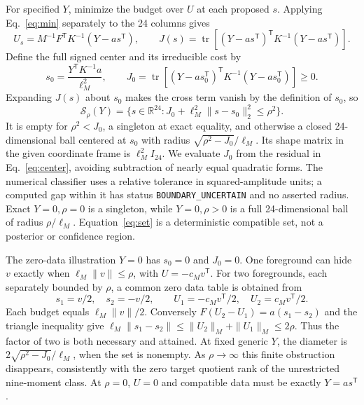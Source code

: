 \documentclass[aps,prd,onecolumn,11pt,nofootinbib,notitlepage]{revtex4-2}
\begin{document}
For specified $Y$, minimize the budget over $U$ at each proposed $s$. Applying Eq.~\eqref{eq:min} separately to the 24 columns gives
\begin{equation}
 U_s=M^{-1}F^{\mathsf T}K^{-1}(Y-a s^{\mathsf T}),\qquad
 J(s)=\operatorname{tr}\left[(Y-a s^{\mathsf T})^{\mathsf T}K^{-1}(Y-a s^{\mathsf T})\right].
 \label{eq:conditional}
\end{equation}
Define the full signed center and its irreducible cost by
\begin{equation}
 s_0=\frac{Y^{\mathsf T}K^{-1}a}{\ell_M^2},\qquad
 J_0=\operatorname{tr}\left[(Y-a s_0^{\mathsf T})^{\mathsf T}K^{-1}(Y-a s_0^{\mathsf T})\right]\ge0.
 \label{eq:center}
\end{equation}
Expanding $J(s)$ about $s_0$ makes the cross term vanish by the definition of $s_0$, so
\begin{equation}
 \boxed{\mathcal S_\rho(Y)=\{s\in\mathbb R^{24}:J_0+\ell_M^2\|s-s_0\|_2^2\le\rho^2\}.}
 \label{eq:set}
\end{equation}
It is empty for $\rho^2<J_0$, a singleton at exact equality, and otherwise a closed 24-dimensional ball centered at $s_0$ with radius $\sqrt{\rho^2-J_0}/\ell_M$. Its shape matrix in the given coordinate frame is $\ell_M^2 I_{24}$. We evaluate $J_0$ from the residual in Eq.~\eqref{eq:center}, avoiding subtraction of nearly equal quadratic forms. The numerical classifier uses a relative tolerance in squared-amplitude units; a computed gap within it has status \texttt{BOUNDARY\_UNCERTAIN} and no asserted radius. Exact $Y=0,\rho=0$ is a singleton, while $Y=0,\rho>0$ is a full 24-dimensional ball of radius $\rho/\ell_M$. Equation~\eqref{eq:set} is a deterministic compatible set, not a posterior or confidence region.

The zero-data illustration $Y=0$ has $s_0=0$ and $J_0=0$. One foreground can hide $v$ exactly when $\ell_M\|v\|\le\rho$, with $U=-c_Mv^{\mathsf T}$. For two foregrounds, each separately bounded by $\rho$, a common zero data table is obtained from
\begin{equation}
 s_1=v/2,\quad s_2=-v/2,\qquad
 U_1=-c_Mv^{\mathsf T}/2,\quad U_2=c_Mv^{\mathsf T}/2.
 \label{eq:pair}
\end{equation}
Each budget equals $\ell_M\|v\|/2$. Conversely $F(U_2-U_1)=a(s_1-s_2)$ and the triangle inequality give $\ell_M\|s_1-s_2\|\le\|U_2\|_M+\|U_1\|_M\le2\rho$. Thus the factor of two is both necessary and attained. At fixed generic $Y$, the diameter is $2\sqrt{\rho^2-J_0}/\ell_M$, when the set is nonempty. As $\rho\to\infty$ this finite obstruction disappears, consistently with the zero target quotient rank of the unrestricted nine-moment class. At $\rho=0$, $U=0$ and compatible data must be exactly $Y=a s^{\mathsf T}$.
\end{document}
